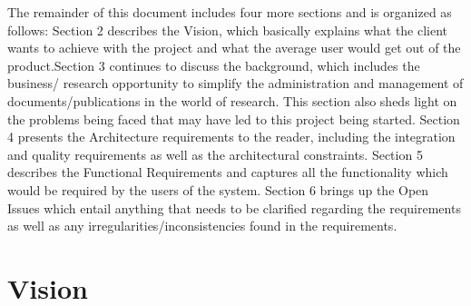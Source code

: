 \documentclass[a4paper,12pt]{report}
\begin{document}
The remainder of this document includes four more sections and is organized as follows:
\newline Section 2 describes the Vision, which basically explains what the client wants to achieve with the project and what the average user would get out of the product.Section 3 continues to discuss the background, which includes the business/ research opportunity to simplify the administration and management of documents/publications in the world of research. This section also sheds light on the problems being faced that may have led to this project being started. Section 4 presents the Architecture requirements to the reader, including the integration and quality requirements as well as the architectural constraints. Section 5 describes the Functional Requirements and captures all the functionality which would be required by the users of the system. Section 6 brings up the Open Issues which entail anything that needs to be clarified regarding the requirements as well as any irregularities/inconsistencies found in the requirements.


\newpage
\section{Vision}
\end{document}

